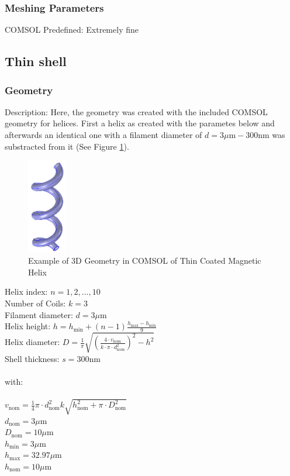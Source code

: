 \subsubsection{Meshing Parameters}
COMSOL Predefined: Extremely fine

\subsection{Thin shell}
\subsubsection{Geometry}

Description: Here, the geometry was created with the included COMSOL geometry for helices. First a helix as created with the parametes below and afterwards an identical one with a filament diameter of $d = 3\mu\text{m} - 300$nm was substracted from it (See Figure \ref{fig:COMSOLthin}).

\begin{figure}[ht]
	\centering
  \includegraphics[width=0.15\textwidth]{Pictures/COMSOLthin.png}
	\caption{Example of 3D Geometry in COMSOL of Thin Coated Magnetic Helix}
	\label{fig:COMSOLthin}
\end{figure}

Helix index: $n = 1,2,...,10$\\
Number of Coils: $k = 3$\\
Filament diameter: $d =  3\mu$m\\
Helix height: $h = h_\text{min} + (n -1)\frac{h_\text{max}-h_\text{min}}{9}$\\
Helix diameter: $D = \frac{1}{\pi}\sqrt{\left(\frac{4\cdot v_\text{nom}}{k\cdot \pi \cdot d_\text{nom}^2}\right)^2 - h^2}$\\
Shell thickness: $s = 300$nm\\\\
with:\\\\
$v_\text{nom} = \frac{1}{4}\pi \cdot d_\text{nom}^2 k \sqrt{h_\text{nom}^2+\pi\cdot D_\text{nom}^2} $\\
$d_\text{nom} = 3\mu$m\\
$D_\text{nom} = 10\mu$m\\
$h_\text{min} = 3\mu$m\\
$h_\text{max} = 32.97\mu$m\\
$h_\text{nom} = 10\mu$m

